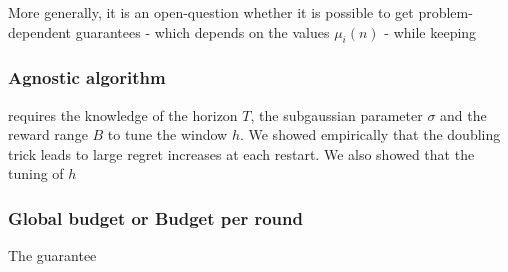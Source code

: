 More generally, it is an open-question whether it is possible to get problem-dependent guarantees - which depends on the values $\mu_i(n)$ - while keeping 


\subsubsection{Agnostic algorithm}
\SWA requires the knowledge of the horizon $T$, the subgaussian parameter $\sigma$ and the reward range $B$  to tune the window $h$. We showed empirically that the doubling trick leads to large regret increases at each restart. We also showed that the tuning of $h$



\subsubsection{Global budget or Budget per round}
The guarantee
